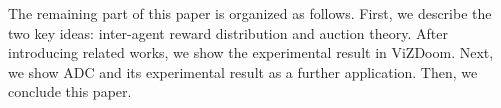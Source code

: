 The remaining part of this paper is organized as follows. 
First, we describe the two key ideas: inter-agent reward distribution and auction theory. 
After introducing related works, we show the experimental result in ViZDoom.
Next, we show ADC and its experimental result as a further application. 
Then, we conclude this paper.
